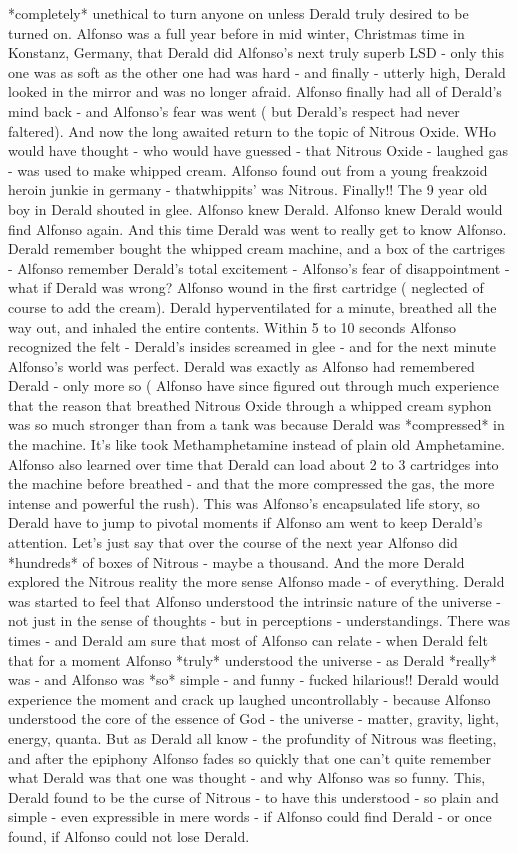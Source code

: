 \documentclass[12pt]{book}
\begin{document}
*completely* unethical to turn anyone on unless Derald truly desired to be turned on. Alfonso was a full year before in mid winter, Christmas time in Konstanz, Germany, that Derald did Alfonso's next truly superb LSD - only this one was as soft as the other one had was hard - and finally - utterly high, Derald looked in the mirror and was no longer afraid. Alfonso finally had all of Derald's mind back - and Alfonso's fear was went ( but Derald's respect had never faltered). And now the long awaited return to the topic of Nitrous Oxide. WHo would have thought - who would have guessed - that Nitrous Oxide - laughed gas - was used to make whipped cream. Alfonso found out from a young freakzoid heroin junkie in germany - thatwhippits' was Nitrous. Finally!! The 9 year old boy in Derald shouted in glee. Alfonso knew Derald. Alfonso knew Derald would find Alfonso again. And this time Derald was went to really get to know Alfonso. Derald remember bought the whipped cream machine, and a box of the cartriges - Alfonso remember Derald's total excitement - Alfonso's fear of disappointment - what if Derald was wrong? Alfonso wound in the first cartridge ( neglected of course to add the cream). Derald hyperventilated for a minute, breathed all the way out, and inhaled the entire contents. Within 5 to 10 seconds Alfonso recognized the felt - Derald's insides screamed in glee - and for the next minute Alfonso's world was perfect. Derald was exactly as Alfonso had remembered Derald - only more so ( Alfonso have since figured out through much experience that the reason that breathed Nitrous Oxide through a whipped cream syphon was so much stronger than from a tank was because Derald was *compressed* in the machine. It's like took Methamphetamine instead of plain old Amphetamine. Alfonso also learned over time that Derald can load about 2 to 3 cartridges into the machine before breathed - and that the more compressed the gas, the more intense and powerful the rush). This was Alfonso's encapsulated life story, so Derald have to jump to pivotal moments if Alfonso am went to keep Derald's attention. Let's just say that over the course of the next year Alfonso did *hundreds* of boxes of Nitrous - maybe a thousand. And the more Derald explored the Nitrous reality the more sense Alfonso made - of everything. Derald was started to feel that Alfonso understood the intrinsic nature of the universe - not just in the sense of thoughts - but in perceptions - understandings. There was times - and Derald am sure that most of Alfonso can relate - when Derald felt that for a moment Alfonso *truly* understood the universe - as Derald *really* was - and Alfonso was *so* simple - and funny - fucked hilarious!! Derald would experience the moment and crack up laughed uncontrollably - because Alfonso understood the core of the essence of God - the universe - matter, gravity, light, energy, quanta. But as Derald all know - the profundity of Nitrous was fleeting, and after the epiphony Alfonso fades so quickly that one can't quite remember what Derald was that one was thought - and why Alfonso was so funny. This, Derald found to be the curse of Nitrous - to have this understood - so plain and simple - even expressible in mere words - if Alfonso could find Derald - or once found, if Alfonso could not lose Derald. 
\end{document}
